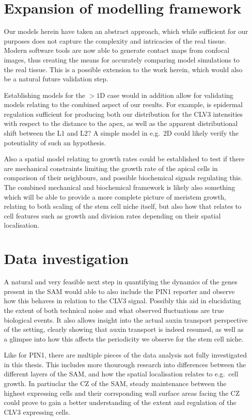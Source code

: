 \section{Expansion of modelling framework}
Our models herein have taken an abstract approach, which while sufficient for
our purposes does not capture the complexity and intricacies of the real tissue.
Modern software tools are now able to generate contact maps from confocal
images, thus creating the means for accurately comparing model simulations to
the real tissue. This is a possible extension to the work herein, which would
also be a natural future validation step. 

Establishing models for the $>1$D case would in addition allow for validating
models relating to the combined aspect of our results. For example, is epidermal
regulation sufficient for producing both our distribution for the CLV3
intensities with respect to the distance to the apex, as well as the apparent
distributional shift between the L1 and L2? A simple model in e.g.\ 2D could
likely verify the potentiality of such an hypothesis.

Also a spatial model relating to growth rates could be established to test if
there are mechanical constraints limiting the growth rate of the apical cells in
comparison of their neighbours, and possible biochemical signals regulating
this. The combined mechanical and biochemical framework is likely also something
which will be able to provide a more complete picture of meristem growth,
relating to both scaling of the stem cell niche itself, but also how that
relates to cell features such as growth and division rates depending on their
spatial localisation.

\section{Data investigation}
A natural and very feasible next step in quantifying the dynamics of the genes
present in the SAM would able to also include the PIN1 reporter and observe how
this behaves in relation to the CLV3 signal. Possibly this aid in elucidating
the extent of both technical noise and what observed fluctuations are true
biological events. It also allows insight into the actual auxin transport
perspective of the setting, clearly showing that auxin transport is indeed
resumed, as well as a glimpse into how this affects the periodicity we observe
for the stem cell niche. 

Like for PIN1, there are multiple pieces of the data analysis not fully
investigated in this thesis. This includes more thourough research into
differences between the different layers of the SAM, and how the spatial
localisation relates to e.g.\ cell growth. In partiuclar the CZ of the SAM,
steady maintenance between the highest expressing cells and their corrsponding
wall surface areas facing the CZ could prove to gain a better understanding of
the extent and regulation of the CLV3 expressing cells. 


